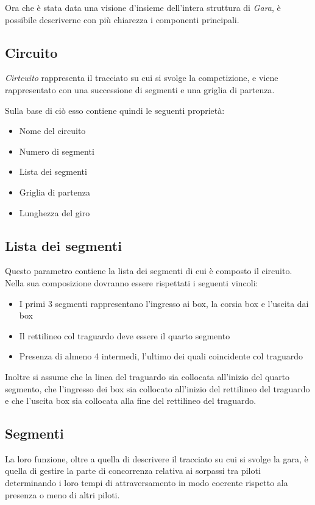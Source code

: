 \documentclass[a4paper,11pt, twoside]{book}
\begin{document}
      Ora che è stata data una visione d'insieme dell'intera struttura di \textsl{Gara}, è possibile descriverne con più
      chiarezza i componenti principali.
	
      \subsection{Circuito}
	\textsl{Cirtcuito} rappresenta il tracciato su cui si svolge la competizione, e viene rappresentato con una successione
	di segmenti e una griglia di partenza.
	
	Sulla base di ciò esso contiene quindi le seguenti proprietà:
	
	\begin{itemize}
	  \item Nome del circuito
	  \item Numero di segmenti
	  \item Lista dei segmenti
	  \item Griglia di partenza
	  \item Lunghezza del giro
	\end{itemize}
	  
	\subsection{Lista dei segmenti}
	  Questo parametro contiene la lista dei segmenti di cui è composto il circuito. Nella sua composizione
	  dovranno essere rispettati i seguenti vincoli:
	  
	  \begin{itemize}
	    \item I primi 3 segmenti rappresentano l'ingresso ai box, la corsia box e l'uscita dai box
	    \item Il rettilineo col traguardo deve essere il quarto segmento
	    \item Presenza di almeno 4 intermedi, l'ultimo dei quali coincidente col traguardo
	  \end{itemize}
	  
	  Inoltre si assume che la linea del traguardo sia collocata all'inizio del quarto segmento, che 
	  l'ingresso dei box sia collocato all'inizio del rettilineo del traguardo e che l'uscita box sia collocata
	  alla fine del rettilineo del traguardo.

      \subsection{Segmenti}
	La loro funzione, oltre a quella di descrivere il tracciato su cui si svolge la gara, è quella
	di gestire la parte di concorrenza relativa ai sorpassi tra piloti determinando i loro tempi di attraversamento
	in modo coerente rispetto ala presenza o meno di altri piloti.
	
\end{document}

